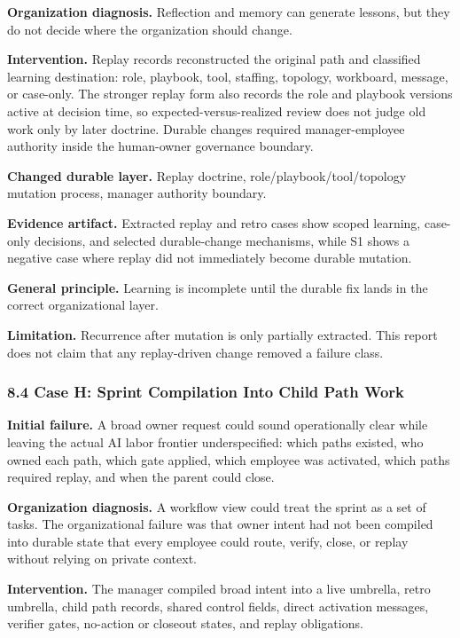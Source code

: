 \documentclass[
]{article}
\begin{document}
\textbf{Organization diagnosis.} Reflection and memory can generate lessons, but they do not decide where the organization should change.

\textbf{Intervention.} Replay records reconstructed the original path and classified learning destination: role, playbook, tool, staffing, topology, workboard, message, or case-only. The stronger replay form also records the role and playbook versions active at decision time, so expected-versus-realized review does not judge old work only by later doctrine. Durable changes required manager-employee authority inside the human-owner governance boundary.

\textbf{Changed durable layer.} Replay doctrine, role/playbook/tool/topology mutation process, manager authority boundary.

\textbf{Evidence artifact.} Extracted replay and retro cases show scoped learning, case-only decisions, and selected durable-change mechanisms, while S1 shows a negative case where replay did not immediately become durable mutation.

\textbf{General principle.} Learning is incomplete until the durable fix lands in the correct organizational layer.

\textbf{Limitation.} Recurrence after mutation is only partially extracted. This report does not claim that any replay-driven change removed a failure class.

\subsubsection{8.4 Case H: Sprint Compilation Into Child Path Work}\label{case-h-sprint-compilation-into-child-path-work}

\textbf{Initial failure.} A broad owner request could sound operationally clear while leaving the actual AI labor frontier underspecified: which paths existed, who owned each path, which gate applied, which employee was activated, which paths required replay, and when the parent could close.

\textbf{Organization diagnosis.} A workflow view could treat the sprint as a set of tasks. The organizational failure was that owner intent had not been compiled into durable state that every employee could route, verify, close, or replay without relying on private context.

\textbf{Intervention.} The manager compiled broad intent into a live umbrella, retro umbrella, child path records, shared control fields, direct activation messages, verifier gates, no-action or closeout states, and replay obligations.
\end{document}
